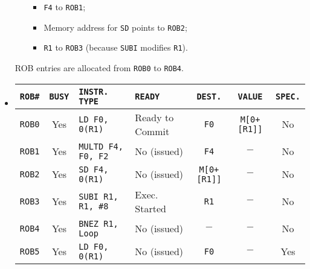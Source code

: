 \begin{examplebox}
\begin{itemize}
\begin{itemize}
\begin{itemize}
                \item \texttt{F4} to \texttt{ROB1};
                \item Memory address for \texttt{SD} points to \texttt{ROB2};
                \item \texttt{R1} to \texttt{ROB3} (because \texttt{SUBI} modifies \texttt{R1}).
            \end{itemize}
        \end{itemize}
        ROB entries are allocated from \texttt{ROB0} to \texttt{ROB4}.


        \newpage


        \item {}
        \begin{center}
            \begin{adjustbox}{width={.92\textwidth},totalheight={\textheight},keepaspectratio}
                \begin{tabular}{@{} c | c | l | l | c | c | c @{}}
                    \toprule
                    \texttt{ROB\#}      & \texttt{BUSY}     & \texttt{INSTR. TYPE}      & \texttt{READY}        & \texttt{DEST.}        & \texttt{VALUE}        & \texttt{SPEC.}    \\
                    \midrule
                    \texttt{ROB0}       & Yes               & \texttt{LD F0, 0(R1)}     & Ready to Commit       & \texttt{F0}           & \texttt{M[0+[R1]]}    & No                \\ [.3em]
                    \texttt{ROB1}       & Yes               & \texttt{MULTD F4, F0, F2} & No (issued)           & \texttt{F4}           & $-$                   & No                \\ [.3em]
                    \texttt{ROB2}       & Yes               & \texttt{SD F4, 0(R1)}     & No (issued)           & \texttt{M[0+[R1]]}    & $-$                   & No                \\ [.3em]
                    \texttt{ROB3}       & Yes               & \texttt{SUBI R1, R1, \#8} & Exec. Started         & \texttt{R1}           & $-$                   & No                \\ [.3em]
                    \texttt{ROB4}       & Yes               & \texttt{BNEZ R1, Loop}    & No (issued)           & $-$                   & $-$                   & No                \\ [.3em]
                    \texttt{ROB5}       & Yes               & \texttt{LD F0, 0(R1)}     & No (issued)           & \texttt{F0}           & $-$                   & Yes               \\ [.3em]

\end{tabular}
\end{adjustbox}
\end{center}
\end{itemize}
\end{examplebox}

